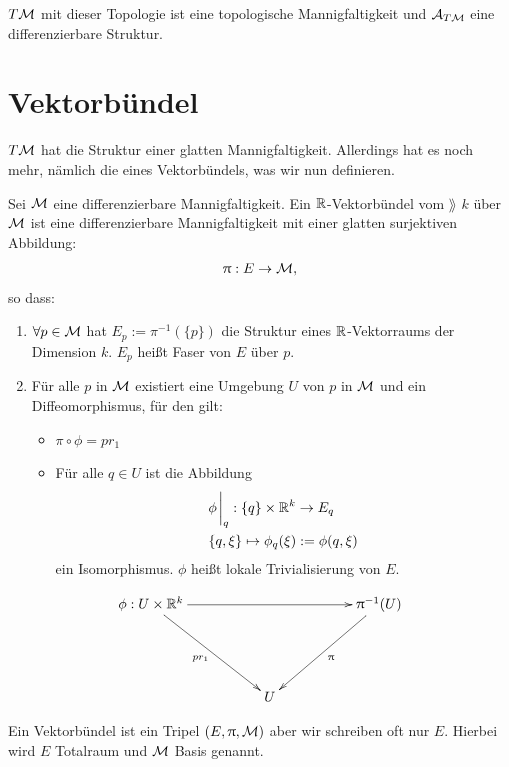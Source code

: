 \begin{satz}
$T\mathcal{M}$ mit dieser Topologie ist eine topologische Mannigfaltigkeit und $\mathcal{A}_{T\mathcal{M}}$ eine differenzierbare Struktur.
\end{satz}
\section{Vektorbündel}
$T\mathcal{M}$ hat die Struktur einer glatten Mannigfaltigkeit.
Allerdings hat es noch mehr, nämlich die eines Vektorbündels, was wir nun definieren.
\begin{defs}[Vektorbündel]
Sei $\mathcal{M}$ eine differenzierbare Mannigfaltigkeit.
Ein $\mathbb{R}$-Vektorbündel vom $\rang$ $k$ über $\mathcal{M}$ ist eine differenzierbare Mannigfaltigkeit mit einer glatten surjektiven Abbildung:
\begin{align}
\uppi: E \to \mathcal{M},
\end{align}
so dass:
\begin{enumerate}
\item $\forall p \in \mathcal{M}$ hat $E_p:= \pi^{-1}( \{ p \})$ die Struktur eines $\mathbb{R}$-Vektorraums der Dimension $k$.
$E_p$ heißt Faser von $E$ über $p$.
\item Für alle $p$ in $\mathcal{M}$ existiert eine Umgebung $U$ von $p$ in $\mathcal{M}$ und ein Diffeomorphismus, für den gilt:
\begin{itemize}
\item $\pi \circ \phi = p r_1$
\item Für alle $q \in U$ ist die Abbildung
\begin{align}
&\phi\eval_q : \{ q \} \times \R^k \to E_q\\
&\{ q, \xi \} \mapsto \phi_q (\xi) := \phi(q, \xi)
\end{align}
ein Isomorphismus.
$\phi$ heißt lokale Trivialisierung von $E$.
\end{itemize}
\end{enumerate}
\begin{align}
\begin{xy}
\xymatrix@=0.15\linewidth{
      \phi: U \times \R^k \ar[rr] \ar[rd]_{pr_1}  &     &  \pi^{-1}(U) \ar[dl]^{\pi}  \\
                             &  U  &}
\end{xy}
\end{align}
\end{defs}
\begin{bem}
Ein Vektorbündel ist ein Tripel $(E, \uppi, \mathcal{M})$ aber wir schreiben oft nur $E$. Hierbei wird $E$ Totalraum und $\mathcal{M}$ Basis genannt.
\end{bem}
